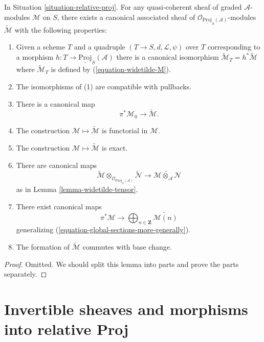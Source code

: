 \begin{lemma}
\label{lemma-relative-proj-modules}
In Situation \ref{situation-relative-proj}.
For any quasi-coherent sheaf of graded $\mathcal{A}$-modules
$\mathcal{M}$ on $S$, there exists a canonical associated sheaf
of $\mathcal{O}_{\underline{\text{Proj}}_S(\mathcal{A})}$-modules
$\widetilde{\mathcal{M}}$ with the following properties:
\begin{enumerate}
\item Given a scheme $T$ and a quadruple
$(T \to S, d, \mathcal{L}, \psi)$ over $T$
corresponding to a morphism
$h : T \to \underline{\text{Proj}}_S(\mathcal{A})$ there is
a canonical isomorphism
$\widetilde{\mathcal{M}}_T = h^*\widetilde{\mathcal{M}}$
where $\widetilde{\mathcal{M}}_T$ is defined by (\ref{equation-widetilde-M}).
\item The isomorphisms of (1) are compatible with pullbacks.
\item There is a canonical map
$$
\pi^*\mathcal{M}_0 \longrightarrow \widetilde{\mathcal{M}}.
$$
\item The construction $\mathcal{M} \mapsto \widetilde{\mathcal{M}}$
is functorial in $\mathcal{M}$.
\item The construction $\mathcal{M} \mapsto \widetilde{\mathcal{M}}$
is exact.
\item There are canonical maps
$$
\widetilde{\mathcal{M}}
\otimes_{\mathcal{O}_{\underline{\text{Proj}}_S(\mathcal{A})}}
\widetilde{\mathcal{N}}
\longrightarrow
\widetilde{\mathcal{M} \otimes_{\mathcal{A}} \mathcal{N}}
$$
as in
Lemma \ref{lemma-widetilde-tensor}.
\item There exist canonical maps
$$
\pi^*\mathcal{M}
\longrightarrow
\bigoplus\nolimits_{n \in \mathbf{Z}}
\widetilde{\mathcal{M}(n)}
$$
generalizing (\ref{equation-global-sections-more-generally}).
\item The formation of $\widetilde{\mathcal{M}}$ commutes with base change.
\end{enumerate}
\end{lemma}

\begin{proof}
Omitted. We should split this lemma into parts and prove the parts separately.
\end{proof}













\section{Invertible sheaves and morphisms into relative Proj}
\label{section-invertible-relative-proj}

